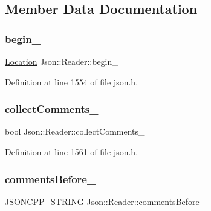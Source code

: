 \subsection{Member Data Documentation}
\hypertarget{class_json_1_1_reader_a327166839022ea91f0a8290960a8af76}{}\label{class_json_1_1_reader_a327166839022ea91f0a8290960a8af76} 
\subsubsection{\texorpdfstring{begin\+\_\+}{begin\_}}
{\footnotesize\ttfamily \hyperlink{class_json_1_1_reader_a46795b5b272bf79a7730e406cb96375a}{Location} Json\+::\+Reader\+::begin\+\_\+\hspace{0.3cm}{\ttfamily [private]}}



Definition at line 1554 of file json.\+h.

\hypertarget{class_json_1_1_reader_a8e9ce743f6004f0596692f0a9ee4626c}{}\label{class_json_1_1_reader_a8e9ce743f6004f0596692f0a9ee4626c} 
\subsubsection{\texorpdfstring{collect\+Comments\+\_\+}{collectComments\_}}
{\footnotesize\ttfamily bool Json\+::\+Reader\+::collect\+Comments\+\_\+\hspace{0.3cm}{\ttfamily [private]}}



Definition at line 1561 of file json.\+h.

\hypertarget{class_json_1_1_reader_af777967adaf0b2e882efa07673754381}{}\label{class_json_1_1_reader_af777967adaf0b2e882efa07673754381} 
\subsubsection{\texorpdfstring{comments\+Before\+\_\+}{commentsBefore\_}}
{\footnotesize\ttfamily \hyperlink{config_8h_a1e723f95759de062585bc4a8fd3fa4be}{J\+S\+O\+N\+C\+P\+P\+\_\+\+S\+T\+R\+I\+NG} Json\+::\+Reader\+::comments\+Before\+\_\+\hspace{0.3cm}{\ttfamily [private]}}



